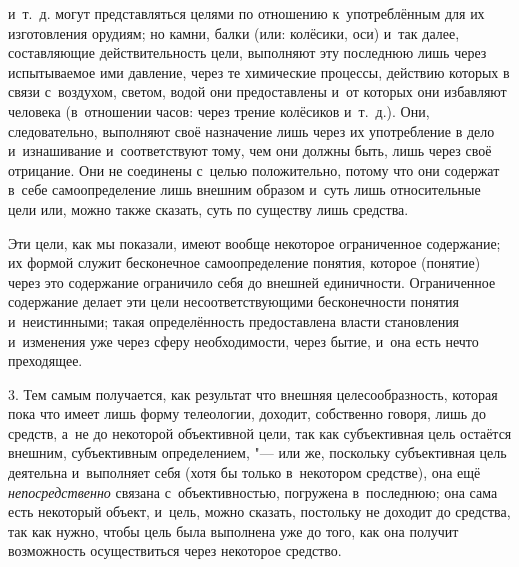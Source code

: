 и~т.~д. могут представляться целями по отношению к~употреблённым для их
изготовления орудиям; но камни, балки (или: колёсики, оси) и~так далее,
составляющие действительность цели, выполняют эту последнюю лишь через
испытываемое ими давление, через те химические процессы, действию которых в
связи с~воздухом, светом, водой они предоставлены и~от которых они
избавляют человека (в~отношении часов: через трение колёсиков и~т.~д.).
Они, следовательно, выполняют своё назначение лишь через их употребление в
дело и~изнашивание и~соответствуют тому, чем они должны быть, лишь через
своё отрицание. Они не соединены с~целью положительно, потому что они
содержат в~себе самоопределение лишь внешним образом и~суть лишь
относительные цели или, можно также сказать, суть по существу лишь
средства.

Эти цели, как мы показали, имеют вообще некоторое ограниченное
содержание; их формой служит бесконечное самоопределение понятия, которое
(понятие) через это содержание ограничило себя до внешней единичности.
Ограниченное содержание делает эти цели несоответствующими бесконечности
понятия и~неистинными; такая определённость предоставлена власти
становления и~изменения уже через сферу необходимости, через бытие, и~она
есть нечто преходящее.

3. Тем самым получается, как результат что внешняя
целесообразность, которая пока что имеет лишь форму телеологии, доходит,
собственно говоря, лишь до средств, а~не до некоторой объективной цели, так
как субъективная цель остаётся внешним, субъективным определением, "---
или же, поскольку субъективная цель деятельна и~выполняет
себя (хотя бы только в~некотором средстве), она ещё
{\em непосредственно}
связана с~объективностью, погружена в~последнюю; она сама
есть некоторый объект, и~цель, можно сказать, постольку не доходит до
средства, так как нужно, чтобы цель была выполнена уже до того, как она
получит возможность осуществиться через некоторое средство.

